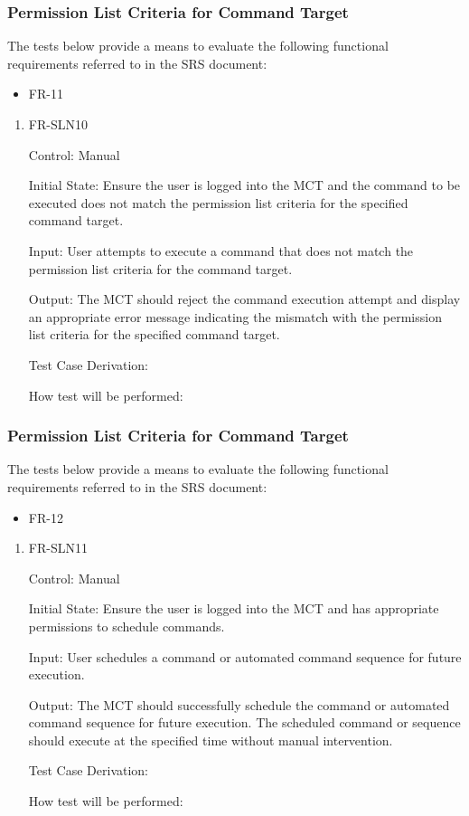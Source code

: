 \documentclass[12pt, titlepage]{article}
\begin{document}
\subsubsection{Permission List Criteria for Command Target}

The tests below provide a means to evaluate the following functional requirements referred to in the SRS document:
\begin{itemize}
    \item FR-11
\end{itemize}

\begin{enumerate}

\item{FR-SLN10\\}

Control: Manual
					
Initial State: Ensure the user is logged into the MCT and the command to be executed does not match the permission list criteria for the specified command target.
	
Input: User attempts to execute a command that does not match the permission list criteria for the command target.
					
Output: The MCT should reject the command execution attempt and display an appropriate error message indicating the mismatch with the permission list criteria for the specified command target.

Test Case Derivation:
					
How test will be performed:

\end{enumerate}

\subsubsection{Permission List Criteria for Command Target}

The tests below provide a means to evaluate the following functional requirements referred to in the SRS document:
\begin{itemize}
    \item FR-12
\end{itemize}

\begin{enumerate}

\item{FR-SLN11\\}

Control: Manual
					
Initial State: Ensure the user is logged into the MCT and has appropriate permissions to schedule commands.
	
Input: User schedules a command or automated command sequence for future execution.
					
Output: The MCT should successfully schedule the command or automated command sequence for future execution. The scheduled command or sequence should execute at the specified time without manual intervention.

Test Case Derivation:
					
How test will be performed:

\end{enumerate}
\end{document}
